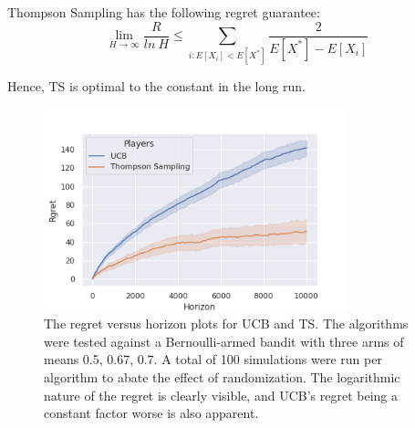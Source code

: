 \documentclass[conference]{IEEEtran}
\begin{document}
Thompson Sampling has the following regret guarantee:
\begin{equation*}
    \lim_{H \to \infty} \dfrac{R}{ln\ H} \leq \sum_{i: E[X_i] < E[X^*]} \dfrac{2}{E[X^*] - E[X_i]}
\end{equation*}

Hence, TS is optimal to the constant in the long run.

\begin{figure}[H]
    \centering
    \includegraphics[width=8.8cm]{plot.png}
    \caption{The regret versus horizon plots for UCB and TS. The algorithms were tested against a Bernoulli-armed bandit with three arms of means 0.5, 0.67, 0.7. A total of 100 simulations were run per algorithm to abate the effect of randomization. The logarithmic nature of the regret is clearly visible, and UCB's regret being a constant factor worse is also apparent.}
    \label{fig:my_label}
\end{figure}
\end{document}
